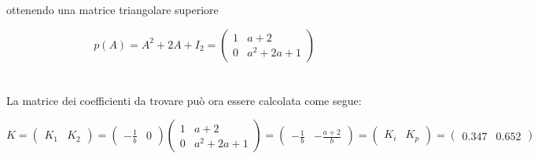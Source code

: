\documentclass[a4paper,13pt]{article}
\begin{document}
	ottenendo una matrice triangolare superiore
	
\begin{equation*}
	p(A)=A^{2}+2A+I_{2}=
\begin{pmatrix}

	1&a+2\\0&a^{2}+2a+1

\end{pmatrix}
\end{equation*} \\ \\

	La matrice dei coefficienti da trovare può ora essere calcolata come segue:

\begin{equation*}
	K=
\begin{pmatrix}

	K_{1}&K_{2}

\end{pmatrix} =                  %
\begin{pmatrix}

	-\frac{1}{b}&0

\end{pmatrix}
\begin{pmatrix}

	1&a+2\\0&a^{2}+2a+1

\end{pmatrix} =                   %
\begin{pmatrix}

	-\frac{1}{b}&-\frac{a+2}{b}

\end{pmatrix} =                    %
\begin{pmatrix}

	K_{i}&K_{p}

\end{pmatrix} =                    %
\begin{pmatrix}

	0.347&0.652

\end{pmatrix}
\end{equation*}\\
\end{document}
